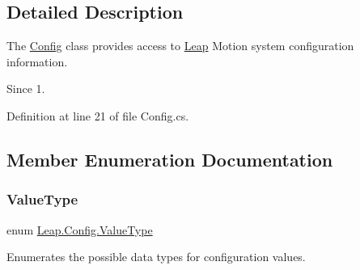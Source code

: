 \subsection{Detailed Description}
The \mbox{\hyperlink{class_leap_1_1_config}{Config}} class provides access to \mbox{\hyperlink{namespace_leap}{Leap}} Motion system configuration information. 

\begin{DoxySince}{Since}
1. 
\end{DoxySince}


Definition at line 21 of file Config.\+cs.



\subsection{Member Enumeration Documentation}
\mbox{\label{class_leap_1_1_config_aee9819af7eacacc324aa72619310a9d8}} 
\subsubsection{\texorpdfstring{ValueType}{ValueType}}
{\footnotesize\ttfamily enum \mbox{\hyperlink{class_leap_1_1_config_aee9819af7eacacc324aa72619310a9d8}{Leap.\+Config.\+Value\+Type}}\hspace{0.3cm}{\ttfamily [strong]}}



Enumerates the possible data types for configuration values. 

